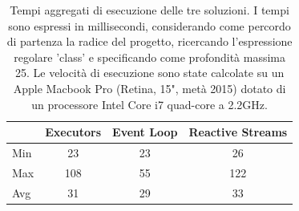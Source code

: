 ﻿\documentclass[a4paper]{article}
\begin{document}
\begin{table}[H]

\centering

\label{my-label}

\begin{tabular}{l|ccc}
\hline
    & Executors & Event Loop & Reactive Streams \\ \hline
Min & 23        & 23         & 26               \\
Max & 108       & 55         & 122               \\
Avg & 31        & 29         & 33               \\ \hline
\end{tabular}

\caption{Tempi aggregati di esecuzione delle tre soluzioni. I tempi sono espressi in millisecondi, considerando come percordo di partenza la radice del progetto, ricercando l'espressione regolare 'class' e specificando come profondità massima 25.
Le velocità di esecuzione sono state calcolate su un Apple Macbook Pro (Retina, 15", metà 2015) dotato di un processore Intel Core i7 quad-core a 2.2GHz.}

\label{Tabella speedup del sistema}

\end{table}

\end{document}
